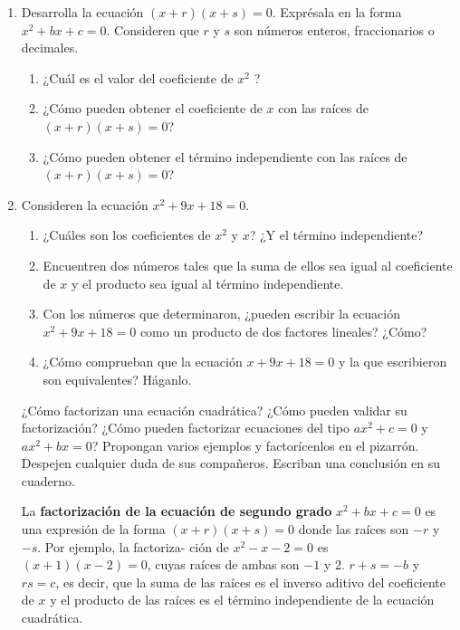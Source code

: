\documentclass[11pt]{book}
\begin{document}
\begin{enumerate}
    \item Desarrolla la ecuación $(x + r)(x + s) = 0$. Exprésala en la forma $x^2 + bx + c = 0$.
          Consideren que $r$ y $s$ son números enteros, fraccionarios o decimales.
          \begin{enumerate}
              \item ¿Cuál es el valor del coeficiente de $x^2$ ?
              \item ¿Cómo pueden obtener el coeficiente de $x$ con las raíces de $(x + r)(x + s) = 0$?
              \item ¿Cómo pueden obtener el término independiente con las raíces de $(x + r)(x + s) = 0$?
          \end{enumerate}
    \item  Consideren la ecuación $x^2 + 9x + 18 = 0$.
          \begin{enumerate}
              \item ¿Cuáles son los coeficientes de $x^2$ y $x$? ¿Y el término independiente?
              \item Encuentren dos números tales que la suma de ellos sea igual al coeficiente de $x$ y el producto sea igual al término independiente.
              \item Con los números que determinaron, ¿pueden escribir la ecuación $x^2 + 9x + 18 = 0$ como un producto de dos factores lineales? ¿Cómo?
              \item ¿Cómo comprueban que la ecuación $x + 9x + 18 = 0$ y la que escribieron son equivalentes? Háganlo.
          \end{enumerate}

          ¿Cómo factorizan una ecuación cuadrática? ¿Cómo pueden validar su factorización? ¿Cómo pueden
          factorizar ecuaciones del tipo $ax^2 + c = 0$ y $ax^2 + bx = 0$? Propongan varios ejemplos
          y factorícenlos en el pizarrón. Despejen cualquier duda de sus compañeros. Escriban una conclusión en su cuaderno.

          \begin{boxH}
              La \textbf{factorización de la ecuación de segundo grado} $x^2 + bx + c = 0$ es una expresión
              de la forma $(x + r) (x + s) = 0$ donde las raíces son $-r$ y $-s$. Por ejemplo, la factoriza-
              ción de $x^2 - x - 2 = 0$ es $(x + 1) (x - 2) = 0$, cuyas raíces de ambas son $- 1$ y $2$.
              $r + s = -b$ y $r s = c$, es decir, que la suma de las raíces es el inverso aditivo del
              coeficiente de $x$ y el producto de las raíces es el término independiente de la ecuación cuadrática.
          \end{boxH}


\end{enumerate}
\end{document}
